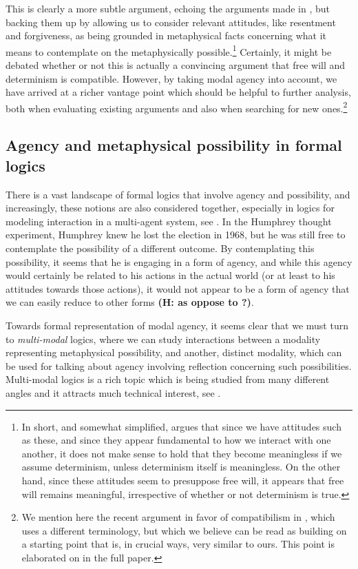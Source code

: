 \documentclass{article}
\newcommand{\hannah}[1]{\textbf{\textcolor{OliveGreen}{(H: #1)}}}
\begin{document}
This is clearly a more subtle argument, echoing the arguments made in \cite{strawsonfree}, but backing them up by allowing us to consider relevant attitudes, like resentment and forgiveness, as being grounded in metaphysical facts concerning what it means to contemplate on the metaphysically possible.\footnote{In short, and somewhat simplified, \cite{strawsonfree} argues that since we have attitudes such as these, and since they appear fundamental to how we interact with one another, it does not make sense to hold that they become meaningless if we assume determinism, unless determinism itself is meaningless. On the other hand, since these attitudes seem to presuppose free will, it appears that free will remains meaningful, irrespective of whether or not determinism is true.} Certainly, it might be debated whether or not this is actually a convincing argument that free will and determinism is compatible. However, by taking modal agency into account, we have arrived at a richer vantage point which should be 
helpful to further analysis, both when evaluating existing arguments and also when searching for new ones.\footnote{We mention here the recent argument in favor of compatibilism in \cite{Listfree}, which uses a different terminology, but which we believe can be read as building on a starting point that is, in crucial ways, very similar to ours. This point is elaborated on in the full paper.}

\subsection*{Agency and metaphysical possibility in formal logics}

There is a vast landscape of formal logics that involve agency and possibility, and increasingly, these notions are also considered together, especially in logics for modeling interaction in a multi-agent system, see \cite{IMAS,Benthem}. In the Humphrey thought experiment, Humphrey knew he lost the election in 1968, but he was still free to contemplate the possibility of a different outcome. By contemplating this possibility, it seems that he is engaging in a form of agency, and while this agency would certainly be related to his actions in the actual world (or at least to his attitudes towards those actions), it would not appear to be a form of agency that we can easily reduce to other forms \hannah{as oppose to ?}.

Towards formal representation of modal agency, it seems clear that we must turn to \emph{multi-modal} logics, where we can study interactions between a modality representing metaphysical possibility, and another, distinct modality, which can be used for talking about agency involving reflection concerning such possibilities. Multi-modal logics is a rich topic which is being studied from many different angles and it attracts much technical interest, see \cite{multimod}. 
\end{document}
